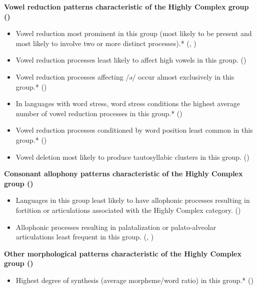 \textbf{Vowel reduction patterns characteristic of the Highly Complex group ()}

\begin{itemize}
\item Vowel reduction most prominent in this group (most likely to be present and most likely to involve two or more distinct processes).* {(, )}
\item Vowel reduction processes least likely to affect high vowels in this group. {()}
\item Vowel reduction processes affecting /ə/ occur almost exclusively in this group.* ()
\item In languages with word stress, word stress conditions the highest average number of vowel reduction processes in this group.* ()
\item Vowel reduction processes conditioned by word position least common in this group.* ()
\item Vowel deletion most likely to produce tautosyllabic clusters in this group. ()
\end{itemize}

\textbf{Consonant allophony patterns characteristic of the Highly Complex group ()}

\begin{itemize}
\item Languages in this group least likely to have allophonic processes resulting in fortition or articulations associated with the Highly Complex category. (\textit{})
\item Allophonic processes resulting in palatalization or palato-alveolar articulations least frequent in this group. {(, )}
\end{itemize}

\textbf{Other morphological patterns characteristic of the Highly Complex group ()}

\begin{itemize}
\item Highest degree of synthesis (average morpheme/word ratio) in this group.* {()}
\end{itemize}

